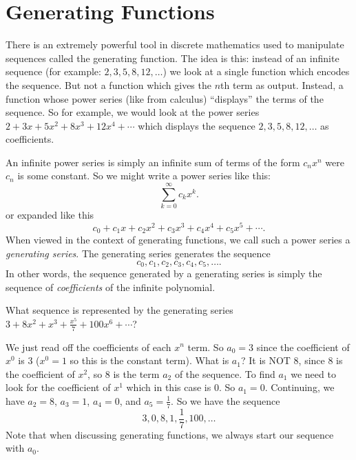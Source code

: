 \documentclass[12pt]{article}
\begin{document}
\section{Generating Functions}

There is an extremely powerful tool in discrete mathematics used to manipulate sequences called the generating function. The idea is this: instead of an infinite sequence (for example: $2, 3, 5, 8, 12, \ldots$) we look at a single function which encodes the sequence.  But not a function which gives the $n$th term as output.  Instead, a function whose power series (like from calculus) ``displays'' the terms of the sequence.  So for example, we would look at the power series $2 + 3x + 5x^2 + 8x^3 + 12x^4 + \cdots$ which displays the sequence $2, 3, 5, 8, 12, \ldots$ as coefficients.

An infinite power series is simply an infinite sum of terms of the form $c_nx^n$ were $c_n$ is some constant.  So we might write a power series like this:
\[\sum_{k=0}^\infty c_k x^k.\]
or expanded like this
\[c_0 + c_1x + c_2x^2 + c_3x^3 + c_4x^4 + c_5x^5 + \cdots.\]
When viewed in the context of generating functions, we call such a power series a {\em generating series}.  The generating series generates the sequence
\[c_0, c_1, c_2, c_3, c_4, c_5, \ldots.\]
In other words, the sequence generated by a generating series is simply the sequence of {\em coefficients} of the infinite polynomial.

\begin{example}
 What sequence is represented by the generating series $3 + 8x^2 + x^3 + \frac{x^5}{7} + 100x^6 + \cdots$?
 \begin{solution}
  We just read off the coefficients of each $x^n$ term.  So $a_0 = 3$ since the coefficient of $x^0$ is 3 ($x^0 = 1$ so this is the constant term).  What is $a_1$?  It is NOT 8, since 8 is the coefficient of $x^2$, so 8 is the term $a_2$ of the sequence.  To find $a_1$ we need to look for the coefficient of $x^1$ which in this case is 0.  So $a_1 = 0$.  Continuing, we have $a_2 = 8$, $a_3 = 1$, $a_4 = 0$, and $a_5 = \frac{1}{7}$.  So we have the sequence
  \[3, 0, 8, 1, \frac{1}{7}, 100, \ldots\]
  Note that when discussing generating functions, we always start our sequence with $a_0$.
 \end{solution}

\end{example}
\end{document}
